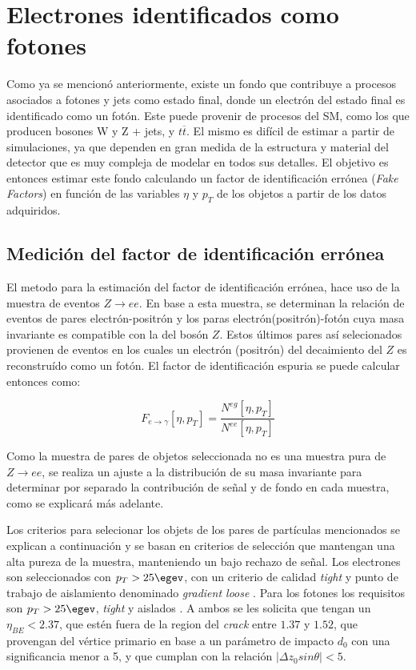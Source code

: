 \chapter{Electrones identificados como fotones}\label{ch:e_fake}


Como ya se mencionó anteriormente, existe un fondo que contribuye a procesos asociados a fotones y jets como estado final, donde un electrón del estado final es identificado como un fotón. Este puede provenir de procesos del SM, como los que producen bosones W y Z + jets, y $t \overline{t}$. El mismo es difícil de estimar a partir de simulaciones, ya que dependen en gran medida de la estructura y material del detector que es muy compleja de modelar en todos sus detalles. El objetivo es entonces estimar este fondo calculando un factor de identificación errónea (\textit{Fake Factors}) en función de las variables $\eta$ y $p_{T}$ de los objetos a partir de los datos adquiridos.

\section{Medición del factor de identificación errónea}

El metodo para la estimación del factor de identificación errónea, hace uso de la muestra de eventos $Z\rightarrow ee$. En base a esta muestra, se determinan la relación de eventos de pares electrón-positrón y los paras electrón(positrón)-fotón cuya masa invariante es compatible con la del bosón $Z$. Estos últimos pares así selecionados provienen de eventos en los cuales un electrón (positrón) del decaimiento del $Z$ es reconstruído como un fotón. El factor de identificación espuria se puede calcular entonces como: 

\begin{equation}
F_{e\rightarrow\gamma}[\eta , p_{T}]=\frac{N^{eg}[\eta , p_{T}]}{N^{ee}[\eta , p_{T}]} \label{eq:ff_ratio}
\end{equation}

Como la muestra de pares de objetos seleccionada no es una muestra pura de $Z\rightarrow ee$, se realiza un ajuste a la distribución de su masa invariante para determinar por separado la contribución de señal y de fondo en cada muestra, como se explicará más adelante.

Los criterios para selecionar los objets de los pares de partículas mencionados se explican a continuación y se basan en criterios de selección que mantengan una alta pureza de la muestra, manteniendo un bajo rechazo de señal.
Los electrones  son seleccionados con $p_{T} > 25 \egev$, con un criterio de calidad \textit{tight} y punto de trabajo de aislamiento denominado \textit{gradient loose} \cite{ATLAS-CONF-2016-024}. Para los fotones los requisitos son $p_{T} > 25 \egev$, \textit{tight} y aislados \cite{STDM-2010-08}. A ambos se les solicita que tengan un $\eta_{BE}<2.37$, que estén fuera de la region del \textit{crack} entre $1.37$ y $1.52$, que provengan del vértice primario en base a un parámetro de impacto $d_{0}$ con una significancia menor a 5, y que cumplan con la relación $|\Delta z_{0}sin\theta|<5$.

